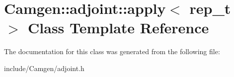 \hypertarget{a00011}{}\section{Camgen\+:\+:adjoint\+:\+:apply$<$ rep\+\_\+t $>$ Class Template Reference}
\label{a00011}


The documentation for this class was generated from the following file\+:\begin{DoxyCompactItemize}
\item 
include/\+Camgen/adjoint.\+h\end{DoxyCompactItemize}
